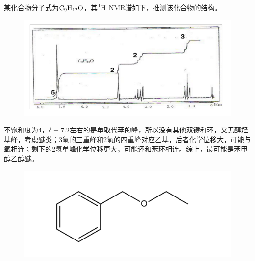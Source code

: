 \begin{example}
	某化合物分子式为$\ce{C9H12O}$，其$\ce{^{1}H}$ NMR谱如下，推测该化合物的结构。
	
	\begin{figure}[!h]
		\centering
		\includegraphics[width=0.9\linewidth]{image/chp6_example1}
		\label{fig:chp6example1}
	\end{figure}
	不饱和度为4，$\delta=7.2$左右的是单取代苯的峰，所以没有其他双键和环，又无醇羟基峰，考虑醚类；3氢的三重峰和2氢的四重峰对应乙基，后者化学位移大，可能与氧相连；剩下的2氢单峰化学位移更大，可能还和苯环相连。综上，最可能是苯甲醇乙醇醚。
	\begin{figure}[!h]
		\centering
		\includegraphics[width=0.6\linewidth]{image/chp6_answer1}
		\label{fig:chp6answer1}
	\end{figure}
\end{example}

